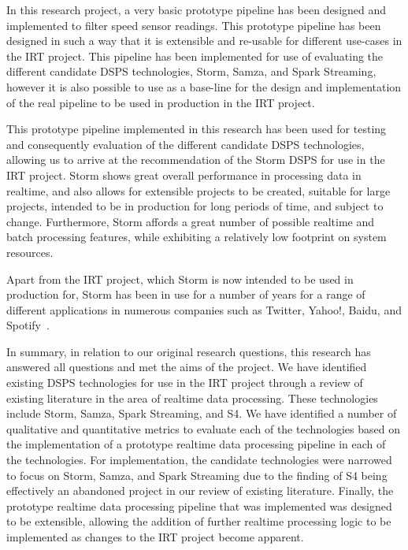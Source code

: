 In this research project, a very basic prototype pipeline has been designed and implemented to filter speed sensor readings.
This prototype pipeline has been designed in such a way that it is extensible and re-usable for different use-cases in the
IRT project. This pipeline has been implemented for use of evaluating the different candidate DSPS technologies, Storm,
Samza, and Spark Streaming, however it is
also possible to use as a base-line for the design and implementation of the real pipeline to be used in production in the
IRT project.

This prototype pipeline implemented in this research has been used for testing and consequently evaluation of the different
candidate DSPS technologies, allowing us to arrive at the recommendation of the Storm DSPS for use in the IRT project.
Storm shows great overall performance in processing data in realtime, and also allows for extensible projects to be created,
suitable for large projects, intended to be in production for long periods of time, and subject to change. Furthermore,
Storm affords a great number of possible realtime and batch processing features, while exhibiting a relatively low
footprint on system resources.

Apart from the IRT project, which Storm is now intended to be used in production for, Storm has been in use for a number of years
for a range of different applications in numerous companies such as Twitter, Yahoo!, Baidu, and Spotify~\cite{storm_users}.

In summary, in relation to our original research questions, this research has answered all questions and met the aims of
the project. We have identified existing DSPS technologies for use in the IRT project through a review of existing literature
in the area of realtime data processing. These technologies include Storm, Samza, Spark Streaming, and S4. We have identified
a number of qualitative and quantitative metrics to evaluate each of the technologies based on the implementation of a
prototype realtime data processing pipeline in each of the technologies. For implementation, the candidate technologies
were narrowed to focus on Storm, Samza, and Spark Streaming due to the finding of S4 being effectively an abandoned project
in our review of existing literature. Finally, the prototype realtime data processing pipeline that was implemented was
designed to be extensible, allowing the addition of further realtime processing logic to be implemented as changes to the
IRT project become apparent.

